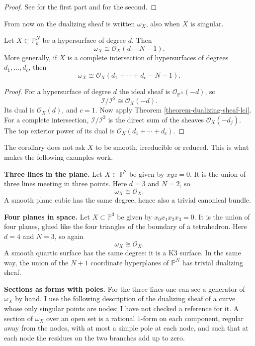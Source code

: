 \begin{proof}
See \cite[III, Corollary 7.12]{har} for
the first part and
\cite[III, Theorem 7.11]{har} for the
second.
\end{proof}

From now on the dualizing sheaf is
written $\omega_X$, also when $X$ is
singular.

\begin{corollary}
\label{corollary-dualizing-hypersurface}
Let $X\subset\mathbb{P}^N_k$ be a
hypersurface of degree $d$. Then
$$
\omega_X\cong\mathcal{O}_X(d-N-1).
$$
More generally, if $X$ is a complete
intersection of hypersurfaces of degrees
$d_1,\ldots,d_c$, then
$$
\omega_X\cong
\mathcal{O}_X(d_1+\cdots+d_c-N-1).
$$
\end{corollary}

\begin{proof}
For a hypersurface of degree $d$ the
ideal sheaf is
$\mathcal{O}_{\mathbb{P}^N}(-d)$, so
$$
\mathcal{I}/\mathcal{I}^2
\cong\mathcal{O}_X(-d).
$$
Its dual is $\mathcal{O}_X(d)$, and
$c=1$. Now apply Theorem
\ref{theorem-dualizing-sheaf-lci}. For a
complete intersection,
$\mathcal{I}/\mathcal{I}^2$ is the direct
sum of the sheaves $\mathcal{O}_X(-d_j)$.
The top exterior power of its dual is
$\mathcal{O}_X(d_1+\cdots+d_c)$.
\end{proof}

The corollary does not ask $X$ to be
smooth, irreducible or reduced. This is
what makes the following examples work.

\medskip\noindent
{\bf Three lines in the plane.}
Let $X\subset\mathbb{P}^2$ be given by
$xyz=0$. It is the union of three lines
meeting in three points. Here $d=3$ and
$N=2$, so
$$
\omega_X\cong\mathcal{O}_X.
$$
A smooth plane cubic has the same degree,
hence also a trivial canonical bundle.

\medskip\noindent
{\bf Four planes in space.}
Let $X\subset\mathbb{P}^3$ be given by
$x_0x_1x_2x_3=0$. It is the union of
four planes, glued like the four
triangles of the boundary of a
tetrahedron. Here $d=4$ and $N=3$, so
again
$$
\omega_X\cong\mathcal{O}_X.
$$
A smooth quartic surface has the same
degree: it is a K3 surface. In the same
way, the union of the $N+1$ coordinate
hyperplanes of $\mathbb{P}^N$ has trivial
dualizing sheaf.

\medskip\noindent
{\bf Sections as forms with poles.}
For the three lines one can see a
generator of $\omega_X$ by hand. I use
the following description of the
dualizing sheaf of a curve whose only
singular points are nodes; I have not
checked a reference for it. A section of
$\omega_X$ over an open set is a rational
$1$-form on each component, regular away
from the nodes, with at most a simple
pole at each node, and such that at each
node the residues on the two branches add
up to zero.

